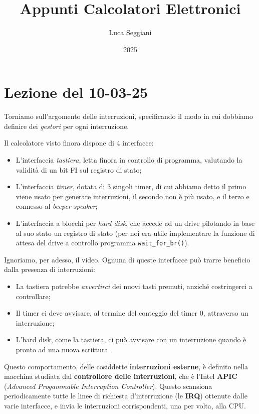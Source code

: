 \documentclass[a4paper,11pt]{article}
\title{Appunti Calcolatori Elettronici}
\author{Luca Seggiani}
\date{2025}
\begin{document}
\section{Lezione del 10-03-25}

\thispagestyle{empty}
\pagestyle{fancy}

Torniamo sull'argomento delle interruzioni, specificando il modo in cui dobbiamo definire dei \textit{gestori} per ogni interruzione.

Il calcolatore visto finora dispone di 4 interfacce: \begin{itemize}
	\item L'interfaccia \textit{tastiera}, letta finora in controllo di programma, valutando la validità di un bit FI sul registro di stato;
	\item L'interfaccia \textit{timer}, dotata di 3 singoli timer, di cui abbiamo detto il primo viene usato per generare interruzioni, il secondo non è più usato, e il terzo e connesso al \textit{beeper speaker};
	\item L'interfaccia a blocchi per \textit{hard disk}, che accede ad un drive pilotando in base al suo stato un registro di stato (per noi era utile implementare la funzione di attesa del drive a controllo programma \lstinline|wait_for_br()|).
\end{itemize} 

Ignoriamo, per adesso, il video.
Ognuna di queste interfacce può trarre beneficio dalla presenza di interruzioni:
\begin{itemize}
	\item La tastiera potrebbe \textit{avvertirci} dei nuovi tasti premuti, anziché costringerci a controllare;
	\item Il timer ci deve avvisare, al termine del conteggio del timer 0, attraverso un interruzione;
	\item L'hard disk, come la tastiera, ci può avvisare con un interruzione quando è pronto ad una nuova scrittura.
\end{itemize}

Questo comportamento, delle cosiddette \textbf{interruzioni esterne}, è definito nella macchina studiata dal \textbf{controllore delle interruzioni}, che è l'Intel \textbf{APIC} (\textit{Advanced Progammable Interruption Controller}).
Questo scansiona periodicamente tutte le linee di richiesta d'interruzione (le \textbf{IRQ}) ottenute dalle varie interfacce, e invia le interruzioni corrispondenti, una per volta, alla CPU. 
\end{document}
